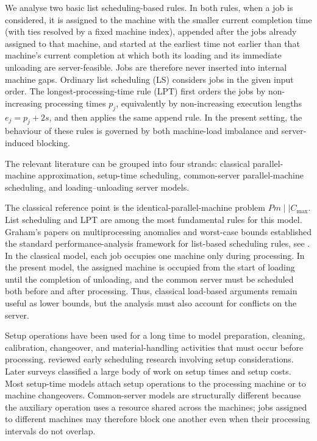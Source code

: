 \documentclass[11pt]{article}
\begin{document}
We analyse two basic list scheduling-based rules. In both rules, when a job is considered,
it is assigned to the machine with the smaller current completion time (with ties
resolved by a fixed machine index), appended after the jobs already assigned to
that machine, and started at the earliest time not earlier than that machine's
current completion at which both its loading and its immediate unloading are
server-feasible. Jobs are therefore never inserted into internal machine gaps.
Ordinary list scheduling (LS) considers jobs in the given input order. The
longest-processing-time rule (LPT) first orders the jobs by non-increasing processing
times \(p_j\), equivalently by non-increasing execution lengths \(e_j=p_j+2s\), and
then applies the same append rule. In the present setting, the behaviour of these
rules is governed by both machine-load imbalance and server-induced blocking.


The relevant literature can be grouped into four strands: classical parallel-machine
approximation, setup-time scheduling, common-server parallel-machine scheduling,
and loading--unloading server models.

The classical reference point is the identical-parallel-machine problem
\(Pm\mid\mid C_{\max}\). List scheduling and LPT are among the most fundamental
rules for this model. Graham's papers on multiprocessing anomalies and worst-case
bounds established the standard performance-analysis framework for list-based
scheduling rules, see \cite{graham1966,graham1969}. In the classical model, each job
occupies one machine only during processing. In the present model, the assigned
machine is occupied from the start of loading until the completion of unloading,
and the common server must be scheduled both before and after processing. Thus,
classical load-based arguments remain useful as lower bounds, but the analysis
must also account for conflicts on the server.

Setup operations have  been used for a long time to model preparation, cleaning, calibration,
changeover, and material-handling activities that must occur before processing.
\cite{allahverdi1999} reviewed early scheduling research involving setup
considerations. Later surveys \citep{allahverdi2008,allahverdi2015} classified a
large body of work on setup times and setup costs. Most setup-time models attach setup
operations to the processing machine or to machine changeovers. Common-server
models are structurally different because the auxiliary operation uses a resource
shared across the machines; jobs assigned to different machines may therefore block
one another even when their processing intervals do not overlap.
\end{document}
